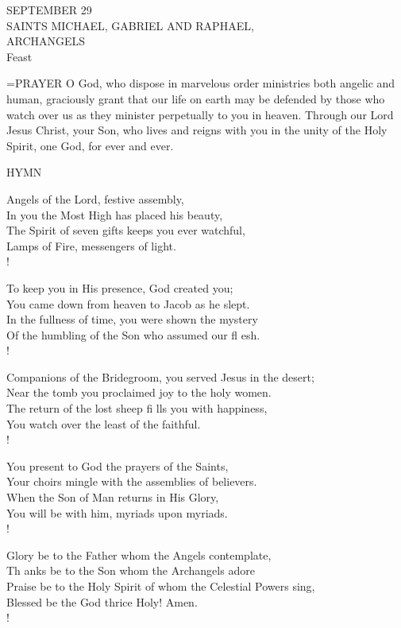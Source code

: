 \begin{center}\normalsize SEPTEMBER 29\\
\footnotesize SAINTS MICHAEL, GABRIEL AND RAPHAEL,\\
\footnotesize ARCHANGELS\\
\footnotesize Feast\\
\end{center}

\hangindent=\parindent \small{PRAYER 
O God, who dispose in marvelous order
ministries both angelic and human,
graciously grant
that our life on earth may be defended
by those who watch over us
as they minister perpetually to you in heaven.
Through our Lord Jesus Christ, your Son,
who lives and reigns with you in the unity of the Holy Spirit,
one God, for ever and ever.\\}
 
\noindent\small{\uppercase{Hymn}}\normalsize\label{archangels:hymn}
\begin{cverse}
Angels of the Lord, festive assembly,\\
In you the Most High has placed his beauty,\\
The Spirit of seven gifts keeps you ever watchful,\\
Lamps of Fire, messengers of light.\\!

To keep you in His presence, God created you;\\
You came down from heaven to Jacob as he slept.\\
In the fullness of time, you were shown the mystery\\
Of the humbling of the Son who assumed our fl esh.\\!

Companions of the Bridegroom, you served Jesus in the desert;\\
Near the tomb you proclaimed joy to the holy women.\\
The return of the lost sheep fi lls you with happiness,\\
You watch over the least of the faithful.\\!

You present to God the prayers of the Saints,\\
Your choirs mingle with the assemblies of believers.\\
When the Son of Man returns in His Glory,\\
You will be with him, myriads upon myriads.\\!

Glory be to the Father whom the Angels contemplate,\\
Th anks be to the Son whom the Archangels adore\\
Praise be to the Holy Spirit of whom the Celestial Powers sing,\\
Blessed be the God thrice Holy! Amen.\\!
\end{cverse}

